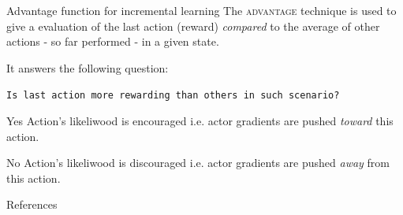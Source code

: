 \documentclass[10pt]{beamer}
\begin{document}
\begin{frame}{Advantage function for incremental learning}
	The \textsc{advantage} technique is used to give a  evaluation of the last action (reward) \textit{compared} to the average of other actions - so far performed - in a given state.
\pause

It answers the following question:	

	\centering
	\texttt{Is last action more rewarding than others in such scenario?}
\pause
	\begin{alertblock}{Yes}
		Action's likeliwood is encouraged i.e. actor gradients are pushed \textit{toward} this action.
	\end{alertblock}
	\begin{alertblock}{No}
		Action's likeliwood is discouraged i.e. actor gradients are pushed \textit{away} from this action. 
	\end{alertblock}
\end{frame}

\begin{frame}[allowframebreaks]{References}

  
  

\end{frame}
\end{document}
